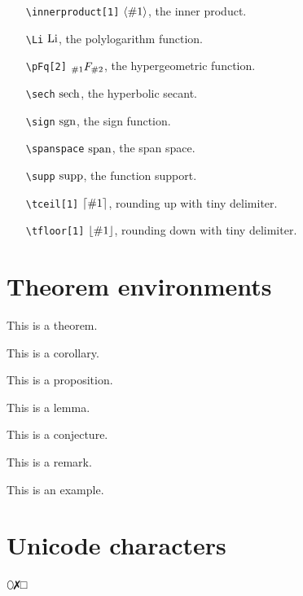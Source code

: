 \documentclass{article}
\begin{document}
\begin{itemize}
    \item[\texttt{\textbackslash innerproduct[1]}] $\left\langle{\#1}\right\rangle$, the inner product.
    \item[\texttt{\textbackslash Li}] $\operatorname{Li}$, the polylogarithm function.
    \item[\texttt{\textbackslash pFq[2]}] ${}_{\#1}F_{\#2}$, the hypergeometric function.
    \item[\texttt{\textbackslash sech}] $\operatorname{sech}$, the hyperbolic secant.
    \item[\texttt{\textbackslash sign}] $\operatorname{sgn}$, the sign function.
    \item[\texttt{\textbackslash spanspace}] $\operatorname{span}$, the span space.
    \item[\texttt{\textbackslash supp}] $\operatorname{supp}$, the function support.
    \item[\texttt{\textbackslash tceil[1]}] $\lceil{\#1}\rceil$, rounding up with tiny delimiter.
    \item[\texttt{\textbackslash tfloor[1]}] $\lfloor{\#1}\rfloor$, rounding down with tiny delimiter.
\end{itemize}

\section{Theorem environments}
\begin{theorem}
    This is a theorem.
\end{theorem}
\begin{corollary}
    This is a corollary.
\end{corollary}
\begin{proposition}
    This is a proposition.
\end{proposition}
\begin{lemma}
    This is a lemma.
\end{lemma}
\begin{conjecture}
    This is a conjecture.
\end{conjecture}

\begin{remark}
    This is a remark.
\end{remark}

\begin{example}
    This is an example.
\end{example}

\section{Unicode characters}
⬯✗□

\nocite{*}


\end{document}
